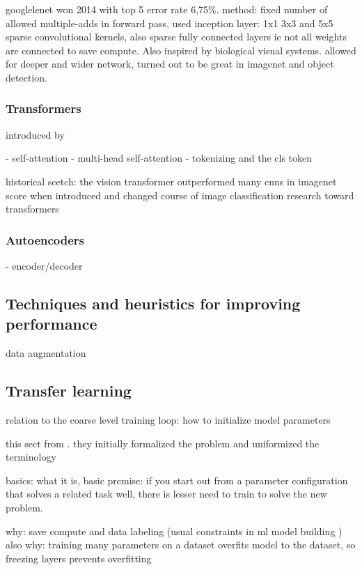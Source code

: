 \documentclass{article}
\begin{document}
googlelenet \cite{googlelenet} won 2014 with top 5 error rate  6,75\%.
method: fixed number of allowed multiple-adds in forward pass, 
used inception layer: 1x1 3x3 and 5x5 sparse convolutional kernels, also 
sparse fully connected layers ie not all weights are connected 
to save compute. Also inspired by biological visual systems. allowed
for deeper and wider network, turned out to be great in imagenet and 
object detection.

\subsubsection{Transformers}

introduced by \cite{attention_is_all_you_need}

- self-attention
- multi-head self-attention
- tokenizing and the cls token

historical scetch: the vision transformer \cite{vit} outperformed many cnns in imagenet score when introduced and changed 
course of image classification research toward transformers

\subsubsection{Autoencoders}

- encoder/decoder

\subsection{Techniques and heuristics for improving performance}

data augmentation

\subsection{Transfer learning}

relation to the coarse level training loop: how to initialize model parameters

this sect from \cite{transferlearning_survey}. they initially formalized the problem and uniformized 
the terminology

basics: what it is, basic premise: if you start out from a parameter configuration that solves a related 
task well, there is lesser need to train to solve the new problem.

why: save compute and data labeling (usual constraints in ml model building \cite{engbook})
also why: training many parameters on a dataset overfits model to the dataset, so freezing layers prevents overfitting \cite{googlelenet}
\end{document}
